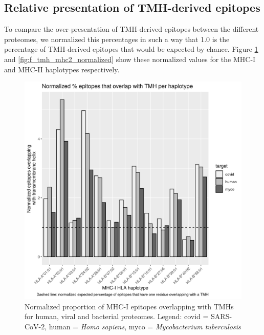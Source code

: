 



\subsection{Relative presentation of TMH-derived epitopes}

To compare the over-presentation of TMH-derived epitopes between the
different proteomes, we normalized this percentages in such a
way that 1.0 is the percentage of TMH-derived epitopes that would 
be expected by chance. 
Figure \ref{fig:f_tmh_mhc1_normalized} and \ref{fig:f_tmh_mhc2_normalized}
show these normalized values for the MHC-I and MHC-II haplotypes respectively.

\begin{figure}[!htbp]
  \includegraphics[width=\textwidth]{bbbq_1_smart_results/fig_f_tmh_mhc1_2_normalized_bw.png}
  \caption{
    Normalized proportion of MHC-I epitopes overlapping with TMHs
    for human, viral and bacterial proteomes.
    Legend: covid = SARS-CoV-2,
    human = \emph{Homo sapiens}, 
    myco = \emph{Mycobacterium tuberculosis}
  }
  \label{fig:f_tmh_mhc1_normalized}
\end{figure}

